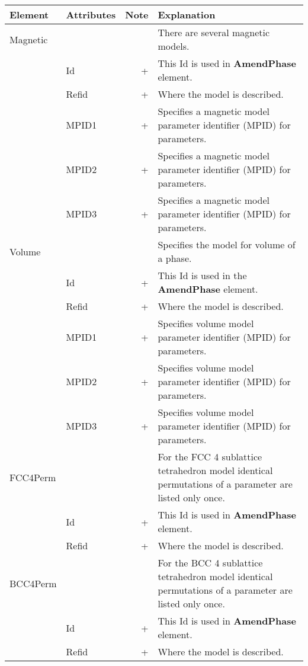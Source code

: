 \documentclass{article}
\begin{document}
\bigskip
\begin{tabular}{|p{} p{} r p{}|}\hline
  Element & Attributes & Note & Explanation\\\hline


  Magnetic & && There are several magnetic models.\\
      & Id & + & This Id is used in {\bf AmendPhase} element.\\
      & Refid & + & Where the model is described.\\
      & MPID1 & + & Specifies a magnetic model parameter identifier (MPID) for parameters.\\
      & MPID2 & + & Specifies a magnetic model parameter identifier (MPID) for parameters.\\
      & MPID3 & + & Specifies a magnetic model parameter identifier (MPID) for parameters.\\\hline

  Volume & && Specifies the model for volume of a phase.\\
      & Id & + & This Id is used in the {\bf AmendPhase} element.\\
      & Refid & + & Where the model is described.\\
      & MPID1 & + & Specifies volume model parameter identifier (MPID) for parameters.\\
      & MPID2 & + & Specifies volume model parameter identifier (MPID) for parameters.\\
      & MPID3 & + & Specifies volume model parameter identifier (MPID) for parameters.\\\hline

  FCC4Perm & & & For the FCC 4 sublattice tetrahedron model identical permutations of a parameter are listed only once.\\
     & Id & + & This Id is used in {\bf AmendPhase} element.\\
     & Refid & + & Where the model is described.\\\hline

  BCC4Perm & & & For the BCC 4 sublattice tetrahedron model identical permutations of a parameter are listed only once.\\
     & Id & + & This Id is used in {\bf AmendPhase} element.\\
     & Refid & + & Where the model is described.\\\hline

\end{tabular}
\end{document}
